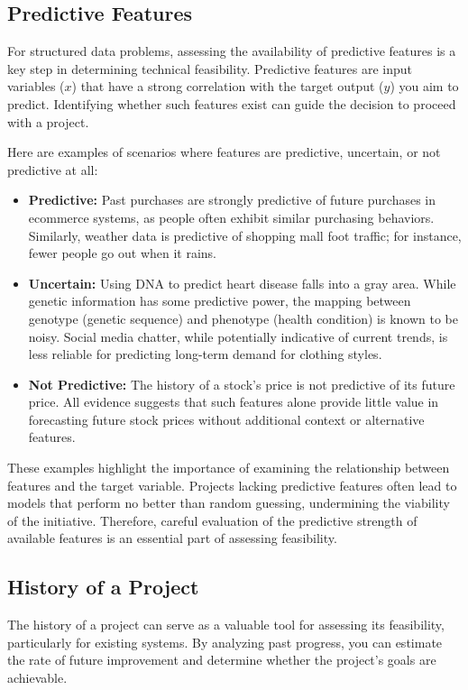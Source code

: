 \documentclass[12pt,openany]{book}
\begin{document}
\subsection{Predictive Features}

For structured data problems, assessing the availability of predictive features is a key step in determining technical feasibility. Predictive features are input variables (\(x\)) that have a strong correlation with the target output (\(y\)) you aim to predict. Identifying whether such features exist can guide the decision to proceed with a project.

Here are examples of scenarios where features are predictive, uncertain, or not predictive at all:
\begin{itemize}
    \item \textbf{Predictive:} Past purchases are strongly predictive of future purchases in ecommerce systems, as people often exhibit similar purchasing behaviors. Similarly, weather data is predictive of shopping mall foot traffic; for instance, fewer people go out when it rains.
    \item \textbf{Uncertain:} Using DNA to predict heart disease falls into a gray area. While genetic information has some predictive power, the mapping between genotype (genetic sequence) and phenotype (health condition) is known to be noisy. Social media chatter, while potentially indicative of current trends, is less reliable for predicting long-term demand for clothing styles.
    \item \textbf{Not Predictive:} The history of a stock's price is not predictive of its future price. All evidence suggests that such features alone provide little value in forecasting future stock prices without additional context or alternative features.
\end{itemize}

These examples highlight the importance of examining the relationship between features and the target variable. Projects lacking predictive features often lead to models that perform no better than random guessing, undermining the viability of the initiative. Therefore, careful evaluation of the predictive strength of available features is an essential part of assessing feasibility.


\subsection{History of a Project}

The history of a project can serve as a valuable tool for assessing its feasibility, particularly for existing systems. By analyzing past progress, you can estimate the rate of future improvement and determine whether the project’s goals are achievable.
\end{document}
